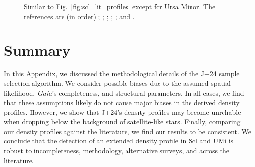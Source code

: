 \begin{figure}
\centering
{}
\caption[Ursa Minor literature density profiles]{Similar to
Fig.~\ref{fig:scl_lit_profiles} except for Ursa Minor. The references
are (in order) \citet[derived using their minor axis
profile]{sato+2025}; \citet{palma+2003}; \citet{martinez-delgado+2001};
\citet{kleyna+1998}; \citet{IH1995}; and
\citet{Hodge1964}.}\label{fig:umi_lit_profiles}
\end{figure}

\section{Summary}\label{summary}

In this Appendix, we discussed the methodological details of the J+24
sample selection algorithm. We consider possible biases due to the
assumed spatial likelihood, \emph{Gaia}'s completeness, and structural
parameters. In all cases, we find that these assumptions likely do not
cause major biases in the derived density profiles. However, we show
that J+24's density profiles may become unreliable when dropping below
the background of satellite-like stars. Finally, comparing our density
profiles against the literature, we find our results to be consistent.
We conclude that the detection of an extended density profile in Scl and
UMi is robust to incompleteness, methodology, alternative surveys, and
across the literature.
